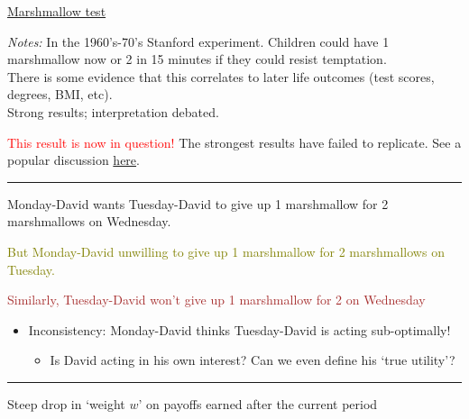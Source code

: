 \documentclass[]{article}
\providecommand{\tightlist}{%
  \setlength{\itemsep}{0pt}\setlength{\parskip}{0pt}}
\begin{document}
\href{https://youtu.be/d8M7Xzjy_m8?t=3}{Marshmallow test}

\emph{Notes:}
In the 1960's-70's Stanford experiment. Children could have 1 marshmallow now or 2 in 15 minutes if they could resist temptation.\\
There is some evidence that this correlates to later life outcomes (test scores, degrees, BMI, etc).\\
Strong results; interpretation debated.

\textcolor{red}{This result is now in question!} The strongest results have failed to replicate. See a popular discussion \href{https://www.vox.com/science-and-health/2018/6/6/17413000/marshmallow-test-replication-mischel-psychology}{here}.

\begin{center}\rule{0.5\linewidth}{\linethickness}\end{center}

Monday-David wants Tuesday-David to give up 1 marshmallow for 2 marshmallows on Wednesday.\\

\bigskip

\textcolor{olive}{But Monday-David unwilling to give up 1 marshmallow for 2 marshmallows on Tuesday.}\\

\bigskip

\textcolor{brown}{Similarly, Tuesday-David won't give up 1 marshmallow for 2 on Wednesday}

\bigskip

\begin{itemize}
\tightlist
\item
  Inconsistency: Monday-David thinks Tuesday-David is acting sub-optimally!

  \begin{itemize}
  \tightlist
  \item
    Is David acting in his own interest? Can we even define his `true utility'?
  \end{itemize}
\end{itemize}

\begin{center}\rule{0.5\linewidth}{\linethickness}\end{center}

\begin{description}
\tightlist
\item[Hyperbolic discounting (simple version)]
Steep drop in `weight \(w\)' on payoffs earned after the current period
\end{description}
\end{document}

